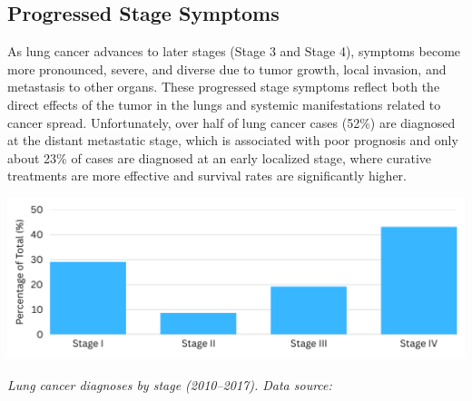 
\subsection{Progressed Stage Symptoms}

As lung cancer advances to later stages (Stage 3 and Stage 4), symptoms become more pronounced, 
severe, and diverse due to tumor growth, local invasion, and metastasis to other organs. These 
progressed stage symptoms reflect both the direct effects of the tumor in the lungs and systemic 
manifestations related to cancer spread. Unfortunately, over half of lung cancer cases (52\%) are 
diagnosed at the distant metastatic stage, which is associated with poor prognosis and only about 
23\% of cases are diagnosed at an early localized stage, where curative treatments are more 
effective and survival rates are significantly higher.


\vspace{1em}
\begin{center}
    \includegraphics[width=\textwidth]{../assets/03-clinical/stages-diagnosis.png}  

    \textit{Lung cancer diagnoses by stage (2010--2017). Data source: \cite{jco2022}}
\end{center}
\vspace{1em}

